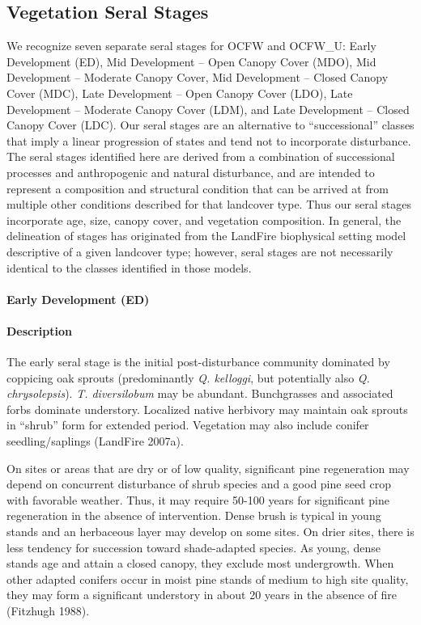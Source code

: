 \subsection*{Vegetation Seral Stages}
We recognize seven separate seral stages for OCFW and OCFW\_U: Early Development (ED), Mid Development – Open Canopy Cover (MDO), Mid Development – Moderate Canopy Cover, Mid Development – Closed Canopy Cover (MDC), Late Development – Open Canopy Cover (LDO), Late Development – Moderate Canopy Cover (LDM), and Late Development – Closed Canopy Cover (LDC). Our seral stages are an alternative to ``successional'' classes that imply a linear progression of states and tend not to incorporate disturbance. The seral stages identified here are derived from a combination of successional processes and anthropogenic and natural disturbance, and are intended to represent a composition and structural condition that can be arrived at from multiple other conditions described for that landcover type. Thus our seral stages incorporate age, size, canopy cover, and vegetation composition. In general, the delineation of stages has originated from the LandFire biophysical setting model descriptive of a given landcover type; however, seral stages are not necessarily identical to the classes identified in those models.

\paragraph{Early Development (ED)} 


\paragraph{Description}
The early seral stage is the initial post-disturbance community dominated by coppicing oak sprouts (predominantly \emph{Q. kelloggi}, but potentially also \emph{Q. chrysolepsis}). \emph{T. diversilobum} may be abundant. Bunchgrasses and associated forbs dominate understory. Localized native herbivory may maintain oak sprouts in ``shrub'' form for extended period. Vegetation may also include conifer seedling/saplings (LandFire 2007a).

On sites or areas that are dry or of low quality, significant pine regeneration may depend on concurrent disturbance of shrub species and a good pine seed crop with favorable weather. Thus, it may require 50-100 years for significant pine regeneration in the absence of intervention. Dense brush is typical in young stands and an herbaceous layer may develop on some sites. On drier sites, there is less tendency for succession toward shade-adapted species. As young, dense stands age and attain a closed canopy, they exclude most undergrowth. When other adapted conifers occur in moist pine stands of medium to high site quality, they may form a significant understory in about 20 years in the absence of fire (Fitzhugh 1988).

